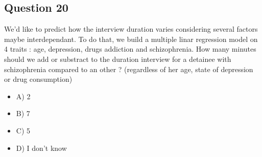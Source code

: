\documentclass[11pt]{article}
\begin{document}
\subsection*{Question 20}
\label{sec:orgdf6ddc9}
We'd like to predict how the interview duration varies considering several
factors maybe interdependant. To do that, we build a multiple linar regression
model on 4 traits : age, depression, drugs addiction and
schizophrenia. How many minutes should we add or substract to the duration
interview for a detainee with schizophrenia compared to an other ? (regardless of
her age, state of depression or drug consumption)

\begin{itemize}
\item A) 2
\item B) 7
\item C) 5
\item D) I don't know
\end{itemize}
\end{document}
